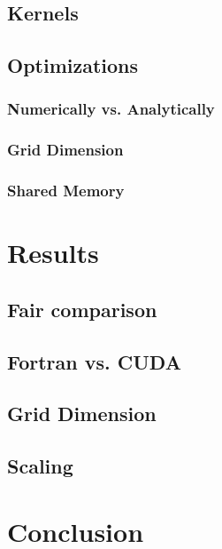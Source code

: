 \documentclass[a4paper,11pt]{kth-mag}
\begin{document}
\section{Kernels}
\section{Optimizations}
\subsection{Numerically vs. Analytically}
\subsection{Grid Dimension}
\subsection{Shared Memory}

\chapter{Results}
\section{Fair comparison}
\section{Fortran vs. CUDA}
\section{Grid Dimension}
\section{Scaling}

\chapter{Conclusion}

\appendix
\addappheadtotoc
\end{document}
